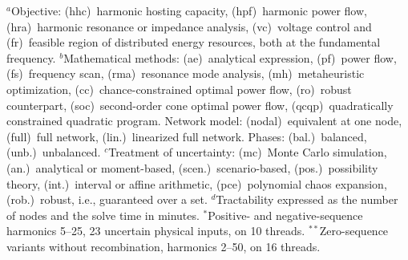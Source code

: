 \begin{table}[!t]
    \vspace{2pt}
    \parbox{\textwidth}{\scriptsize
    $^{a}$Objective: (hhc)~harmonic hosting capacity, (hpf)~harmonic power flow, (hra)~harmonic resonance or impedance analysis, (vc)~voltage control and (fr)~feasible region of distributed energy resources, both at the fundamental frequency.
    $^{b}$Mathematical methods: (ae)~analytical expression, (pf)~power flow, (fs)~frequency scan, (rma)~resonance mode analysis, (mh)~metaheuristic optimization, (cc)~chance-constrained optimal power flow, (ro)~robust counterpart, (soc)~second-order cone optimal power flow, (qcqp)~quadratically constrained quadratic program. Network model: (nodal)~equivalent at one node, (full)~full network, (lin.)~linearized full network. Phases: (bal.)~balanced, (unb.)~unbalanced.
    $^{c}$Treatment of uncertainty: (mc)~Monte Carlo simulation, (an.)~analytical or moment-based, (scen.)~scenario-based, (pos.)~possibility theory, (int.)~interval or affine arithmetic, (pce)~polynomial chaos expansion, (rob.)~robust, i.e., guaranteed over a set.
    $^{d}$Tractability expressed as the number of nodes and the solve time in minutes. $^{*}$Positive- and negative-sequence harmonics 5--25, 23 uncertain physical inputs, on 10 threads. $^{**}$Zero-sequence variants without recombination, harmonics 2--50, on 16 threads.}
\end{table}

